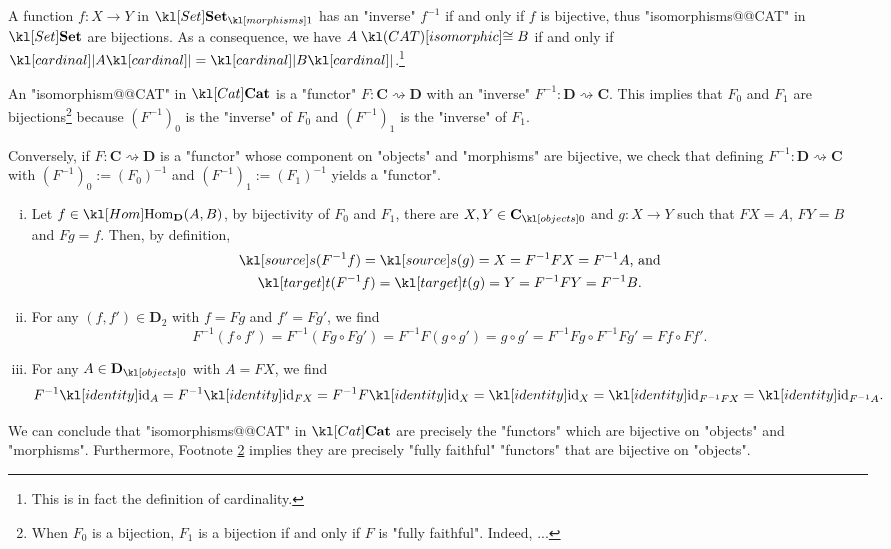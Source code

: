 \documentclass[main.tex]{subfiles}
\begin{document}
\begin{exmp}[$\catSet$]
	A function $f: X \rightarrow Y$ in $\mor{\catSet}$ has an "inverse" $f^{-1}$ if and only if $f$ is bijective, thus "isomorphisms@@CAT" in $\catSet$ are bijections. As a consequence, we have $A \isoCAT B$ if and only if $\cardinal{A} = \cardinal{B}$.\footnote{This is in fact the definition of cardinality.}
\end{exmp}
\begin{exmp}[$\catCat$]
	An "isomorphism@@CAT" in $\catCat$ is a "functor" $F:\mathbf{C} \rightsquigarrow \mathbf{D}$ with an "inverse" $F^{-1}: \mathbf{D} \rightsquigarrow \mathbf{C}$. This implies that $F_0$ and $F_1$ are bijections\footnote{\label{foot:bijfullfaith}When $F_0$ is a bijection, $F_1$ is a bijection if and only if $F$ is "fully faithful". Indeed, ...} because $(F^{-1})_0$ is the "inverse" of $F_0$ and $(F^{-1})_1$ is the "inverse" of $F_1$. %

	Conversely, if $F:\mathbf{C} \rightsquigarrow \mathbf{D}$ is a "functor" whose component on "objects" and "morphisms" are bijective, we check that defining $F^{-1}: \mathbf{D} \rightsquigarrow \mathbf{C}$ with $(F^{-1})_0 := (F_0)^{-1}$ and $(F^{-1})_1 := (F_1)^{-1}$ yields a "functor".
	\begin{enumerate}[i.]
		\item Let $f\in \Hom_{\mathbf{D}}(A,B)$, by bijectivity of $F_0$ and $F_1$, there are $X,Y \in \obj{\mathbf{C}}$ and $g:X \rightarrow Y$ such that $FX = A$, $FY = B$ and $Fg = f$. Then, by definition,
		\begin{gather*}
			\source( F^{-1}f ) = \source(g) = X = F^{-1}FX = F^{-1} A\text{, and}\\
			\target( F^{-1}f ) = \target(g) = Y = F^{-1}FY = F^{-1} B.
		\end{gather*}
		\item For any $(f,f') \in \mathbf{D}_2$ with $f = Fg$ and $f' = Fg'$, we find \[F^{-1}(f \circ f') = F^{-1}(Fg \circ Fg') = F^{-1}F(g \circ g') = g \circ g' = F^{-1}Fg \circ F^{-1}Fg' = Ff \circ Ff'.\]
		\item For any $A \in \obj{\mathbf{D}}$ with $A = FX$, we find
		\[F^{-1}\id_A = F^{-1}\id_{FX} = F^{-1}F\id_X = \id_X = \id_{F^{-1}FX} = \id_{F^{-1}A}.\]
	\end{enumerate}
	We can conclude that "isomorphisms@@CAT" in $\catCat$ are precisely the "functors" which are bijective on "objects" and "morphisms". Furthermore, Footnote \ref{foot:bijfullfaith} implies they are precisely "fully faithful" "functors" that are bijective on "objects".
\end{exmp}
\end{document}
